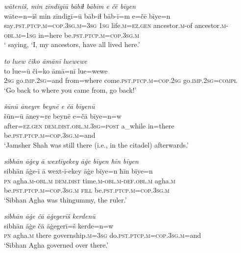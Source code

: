 \ea \label{DP.20}
\textit{wāteniš, min zīndigīū bābiɫ bābīm e čē bīyen} \\ 
\gll wāte=n=iš min zīndigī=ū bāb-iɫ bāb-ī=m e=čē bīye=n \\ 
 say\textsc{.pst}\textsc{.ptcp}\textsc{.m}\textsc{=cop}\textsc{.3sg}\textsc{.m}\textsc{=3sg} \textsc{1sg} life\textsc{.m}\textsc{=ez}\textsc{.gen} ancestor\textsc{.m}-of ancestor\textsc{.m}\textsc{-obl}\textsc{.m}\textsc{=1sg} in=here be\textsc{.pst}\textsc{.ptcp}\textsc{.m}\textsc{=cop}\textsc{.3sg}\textsc{.m} \\ 
\glt ` saying, ‘I, my ancestors, have all lived here.'
\z 
 
\ea \label{DP.24}
\textit{to luew čiko āmānī luewewe} \\ 
\gll to lue=ū či=ko āmā=nī lue=wewe \\ 
 \textsc{2sg} go\textsc{.imp}\textsc{.\textsc{2sg}}=and from=where come\textsc{.pst}\textsc{.ptcp}\textsc{.m}\textsc{=cop}\textsc{.\textsc{2sg}} go\textsc{.imp}\textsc{.\textsc{2sg}}\textsc{=compl} \\ 
\glt `Go back to where you came from, go back!'
\z 
 
\ea \label{DP.25}
\textit{šūnū āneyre beynē e čā bīyenū} \\ 
\gll šūn=ū āney=re beynē e=čā bīye=n=w \\ 
 after\textsc{=ez}\textsc{.gen} \textsc{dem.dist}\textsc{.obl}\textsc{.m}\textsc{.3sg}\textsc{=\textsc{post}} a\_while in=there be\textsc{.pst}\textsc{.ptcp}\textsc{.m}\textsc{=cop}\textsc{.3sg}\textsc{.m}=and \\ 
\glt `Jamsher Shah was still there (i.e., in the citadel) afterwards.'
\z 
 
\ea \label{DP.26}
\textit{sibhān āġey ā wextīyekey āġe bīyen ħīn bīyen} \\ 
\gll sibhān āġe-ī ā wext-ī-ekey āġe bīye=n ħīn bīye=n \\ 
 \textsc{pn} agha\textsc{.m}\textsc{-obl}\textsc{.m} \textsc{dem.dist} time\textsc{.m}\textsc{-obl}\textsc{.m}\textsc{-def}\textsc{.obl}\textsc{.m} agha\textsc{.m} be\textsc{.pst}\textsc{.ptcp}\textsc{.m}\textsc{=cop}\textsc{.3sg}\textsc{.m} \textsc{fill} be\textsc{.pst}\textsc{.ptcp}\textsc{.m}\textsc{=cop}\textsc{.3sg}\textsc{.m} \\ 
\glt `Sibhan Agha was thingummy, the ruler.'
\z 
 
\ea \label{DP.27}
\textit{sibhān āġe čā āġegerīš kerdenū} \\ 
\gll sibhān āġe čā āġegerī=š kerde=n=w \\ 
 \textsc{pn} agha\textsc{.m} there governship\textsc{.m}\textsc{=3sg} do\textsc{.pst}\textsc{.ptcp}\textsc{.m}\textsc{=cop}\textsc{.3sg}\textsc{.m}=and \\ 
\glt `Sibhan Agha governed over there.'
\z 
 
